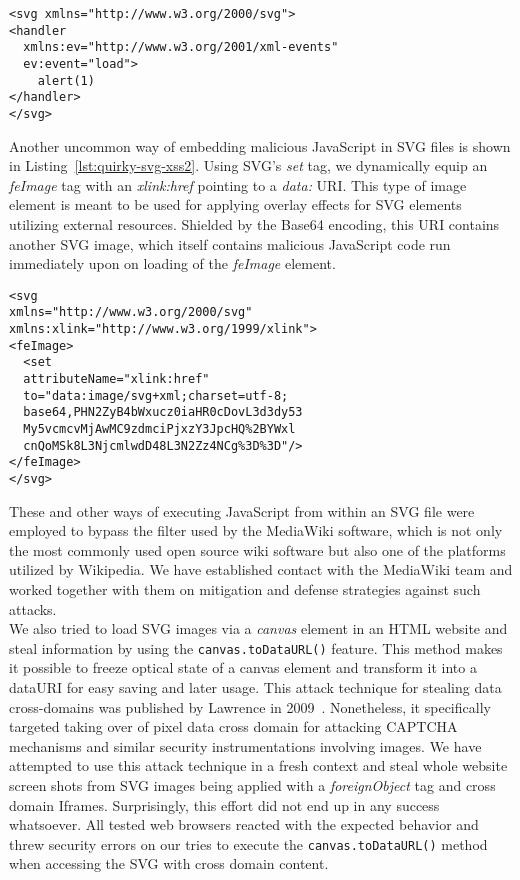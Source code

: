 \begin{lstlisting}[label=lst:quirky-svg-xss1,caption=Example for uncommon SVG-based JavaScript execution via handler element,captionpos=b]
<svg xmlns="http://www.w3.org/2000/svg">
<handler 
  xmlns:ev="http://www.w3.org/2001/xml-events" 
  ev:event="load">
    alert(1)
</handler>
</svg>
\end{lstlisting}

    Another uncommon way of embedding malicious JavaScript in SVG files is shown in Listing~\ref{lst:quirky-svg-xss2}. Using SVG's \textit{set} tag, we dynamically equip an \textit{feImage} tag with an \textit{xlink:href} pointing to a \textit{data:} URI. This type of image element is meant to be used for applying overlay effects for SVG elements utilizing external resources. Shielded by the Base64 encoding, this URI contains another SVG image, which itself contains malicious JavaScript code run immediately upon on loading of the \textit{feImage} element. \\

\begin{lstlisting}[captionpos=b,label=lst:quirky-svg-xss2,caption=Example for uncommon SVG-based JavaScript execution via set element,captionpos=b]
<svg 
xmlns="http://www.w3.org/2000/svg" 
xmlns:xlink="http://www.w3.org/1999/xlink">
<feImage>
  <set 
  attributeName="xlink:href" 
  to="data:image/svg+xml;charset=utf-8;
  base64,PHN2ZyB4bWxucz0iaHR0cDovL3d3dy53
  My5vcmcvMjAwMC9zdmciPjxzY3JpcHQ%2BYWxl
  cnQoMSk8L3NjcmlwdD48L3N2Zz4NCg%3D%3D"/>
</feImage>
</svg>
\end{lstlisting}

    These and other ways of executing JavaScript from within an SVG file were employed to bypass the filter used by the MediaWiki software, which is not only the most commonly used open source wiki software but also one of the platforms utilized by Wikipedia. We have established contact with the Media\-Wiki team and worked together with them on mitigation and defense strategies against such attacks.\\

    We also tried to load SVG images via a \textit{canvas} element in an HTML website and steal information by using the \texttt{canvas.toDataURL()} feature. This method makes it possible to freeze optical state of a canvas element and transform it into a dataURI for easy saving and later usage. This attack technique for stealing data cross-domains was published by Lawrence in 2009~\cite{lawrence_same_2009}. Nonetheless, it specifically targeted taking over of pixel data cross domain for attacking CAPTCHA mechanisms and similar security instrumentations involving images. We have attempted to use this attack technique in a fresh context and steal whole website screen shots from SVG images being applied with a \textit{foreignObject} tag and cross domain Iframes. Surprisingly, this effort did not end up in any success whatsoever. All tested web browsers reacted with the expected behavior and threw security errors on our tries to execute the \texttt{canvas.toDataURL()} method when accessing the SVG with cross 
domain content.\\

